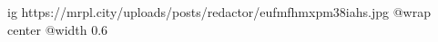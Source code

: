  
 
 
 
 

\ifcmt
  ig https://mrpl.city/uploads/posts/redactor/eufmfhmxpm38iahs.jpg
  @wrap center
  @width 0.6
\fi

